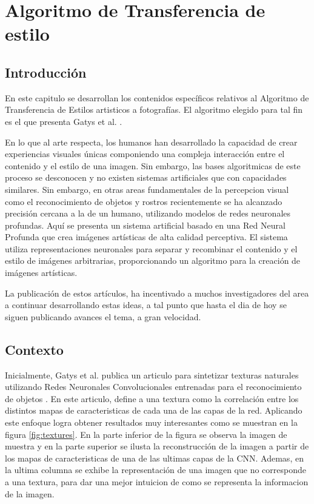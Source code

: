 \documentclass[a4paper,11pt,spanish]{book}
\begin{document}
\chapter{Algoritmo de Transferencia de estilo} \label{chapter:style_transfer}
    \section{Introducción}
      En este capitulo se desarrollan los contenidos específicos relativos al Algoritmo de Transferencia de Estilos artisticos a fotografías. 
      El algoritmo elegido para tal fin es el que presenta Gatys et al. \cite{Gatys:Neural_Style}. 
      
      En lo que al arte respecta, los humanos han desarrollado la capacidad de crear experiencias visuales únicas componiendo una compleja interacción entre el contenido y el estilo de una imagen.
      Sin embargo, las bases algoritmicas de este proceso se desconocen y no existen sistemas artificiales que con capacidades similares. Sin embargo, en otras areas fundamentales
      de la percepcion visual como el reconocimiento de objetos y rostros recientemente se ha alcanzado precisión cercana a la de un humano, utilizando modelos de redes neuronales profundas.
      Aquí se presenta un sistema artificial basado en una Red Neural Profunda que crea imágenes artísticas de alta calidad perceptiva. El sistema utiliza representaciones neuronales
      para separar y recombinar el contenido y el estilo de imágenes arbitrarias, proporcionando un algoritmo para la creación de imágenes artísticas.
      
      La publicación de estos artículos, ha incentivado a muchos investigadores del area a continuar desarrollando estas ideas, a tal punto que hasta el dia de hoy se siguen publicando
      avances el tema, a gran velocidad.


    \section{Contexto}
      Inicialmente, Gatys et al. publica un articulo para sintetizar texturas naturales utilizando Redes Neuronales Convolucionales entrenadas para el reconocimiento de objetos \cite{Gatys:Texture_Synthesis}.
      En este articulo, define a una textura como la correlación entre los distintos mapas de caracteristicas de cada una de las capas de la red. Aplicando este enfoque
      logra obtener resultados muy interesantes como se muestran en la figura \ref{fig:textures}. En la parte inferior de la figura se observa la imagen de muestra y en la parte superior
      se ilusta la reconstrucción de la imagen a partir de los mapas de caracteristicas de una de las ultimas capas de la CNN. Ademas, en la ultima columna se exhibe la representación
      de una imagen que no corresponde a una textura, para dar una mejor intuicion de como se representa la informacion de la imagen.
      
\end{document}
